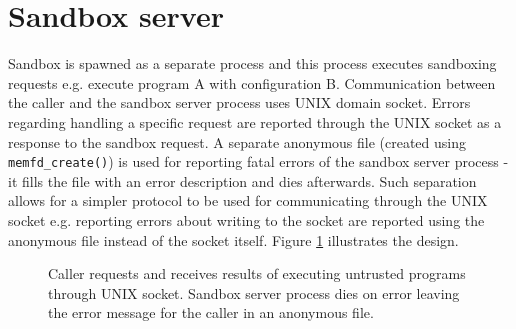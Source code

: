 \documentclass[licencjacka,en]{pracamgr}
\begin{document}
\section{Sandbox server}

Sandbox is spawned as a separate process and this process executes sandboxing requests e.g. execute program A with configuration B. Communication between the caller and the sandbox server process uses UNIX domain socket. Errors regarding handling a specific request are reported through the UNIX socket as a response to the sandbox request. A separate anonymous file (created using \texttt{memfd\_create()}) is used for reporting fatal errors of the sandbox server process - it fills the file with an error description and dies afterwards. Such separation allows for a simpler protocol to be used for communicating through the UNIX socket e.g. reporting errors about writing to the socket are reported using the anonymous file instead of the socket itself. Figure \ref{fig:caller_to_sandbox_server_communication} illustrates the design.

\begin{figure}[h]
\tikzset{>=latex} %
\centering
{}
\caption{Caller requests and receives results of executing untrusted programs through UNIX socket. Sandbox server process dies on error leaving the error message for the caller in an anonymous file.}
\label{fig:caller_to_sandbox_server_communication}
\end{figure}
\end{document}

